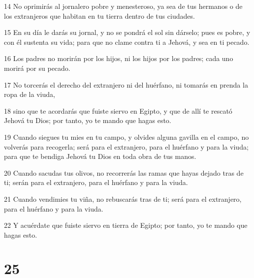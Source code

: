\par 14 No oprimirás al jornalero pobre y menesteroso, ya sea de tus hermanos o de los extranjeros que habitan en tu tierra dentro de tus ciudades.
\par 15 En su día le darás su jornal, y no se pondrá el sol sin dárselo; pues es pobre, y con él sustenta su vida; para que no clame contra ti a Jehová, y sea en ti pecado. 
\par 16 Los padres no morirán por los hijos, ni los hijos por los padres; cada uno morirá por su pecado. 
\par 17 No torcerás el derecho del extranjero ni del huérfano, ni tomarás en prenda la ropa de la viuda,
\par 18 sino que te acordarás que fuiste siervo en Egipto, y que de allí te rescató Jehová tu Dios; por tanto, yo te mando que hagas esto.
\par 19 Cuando siegues tu mies en tu campo, y olvides alguna gavilla en el campo, no volverás para recogerla; será para el extranjero, para el huérfano y para la viuda; para que te bendiga Jehová tu Dios en toda obra de tus manos.
\par 20 Cuando sacudas tus olivos, no recorrerás las ramas que hayas dejado tras de ti; serán para el extranjero, para el huérfano y para la viuda.
\par 21 Cuando vendimies tu viña, no rebuscarás tras de ti; será para el extranjero, para el huérfano y para la viuda.
\par 22 Y acuérdate que fuiste siervo en tierra de Egipto; por tanto, yo te mando que hagas esto.

\chapter{25}

